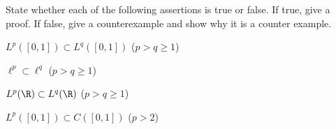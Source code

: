 State whether each of the following assertions is true or false. If
true, give a proof. If false, give a counterexample and show why it is
a counter example.
\begin{alist}
\item $L^p([0,1])\subset L^q([0,1])$ ($p>q \geq 1$)
\item $\ell^p\subset \ell^q$  ($p>q\geq 1$)
\item $L^p(\R)\subset L^q(\R)$ ($p>q\geq 1$)
\item $L^p([0,1])\subset C([0,1])$ ($p>2$)
\end{alist}
